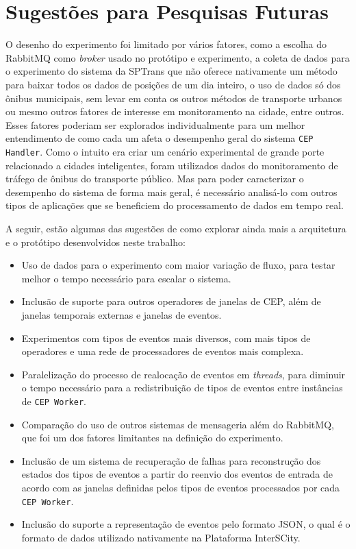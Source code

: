 \section{Sugestões para Pesquisas Futuras} 

O desenho do experimento foi limitado por vários fatores, como a escolha do RabbitMQ como \textit{broker} usado no protótipo e experimento, a coleta de dados para o experimento do sistema da SPTrans que não oferece nativamente um método para baixar todos os dados de posições de um dia inteiro, o uso de dados só dos ônibus municipais, sem levar em conta os outros métodos de transporte urbanos ou mesmo outros fatores de interesse em monitoramento na cidade, entre outros. Esses fatores poderiam ser explorados individualmente para um melhor entendimento de como cada um afeta o desempenho geral do sistema  \texttt{CEP Handler}. %
Como o intuito era criar um cenário experimental de grande porte relacionado a cidades inteligentes, foram utilizados dados do monitoramento de tráfego de ônibus do transporte público. Mas para poder caracterizar o desempenho do sistema de forma mais geral, é necessário analisá-lo com outros tipos de aplicações que se beneficiem do processamento de dados em tempo real. 

A seguir, estão algumas das sugestões de como explorar ainda mais a arquitetura e o protótipo desenvolvidos neste trabalho:

\begin{itemize}
    \item Uso de dados para o experimento com maior variação de fluxo, para testar melhor o tempo necessário para escalar o sistema.
    \item Inclusão de suporte para outros operadores de janelas de CEP, além de janelas temporais externas e janelas de eventos.
    \item Experimentos com tipos de eventos mais diversos, com mais tipos de operadores e uma rede de processadores de eventos mais complexa.
    \item Paralelização do processo de realocação de eventos em \textit{threads}, para diminuir o tempo necessário para a redistribuição de tipos de eventos entre instâncias de \texttt{CEP Worker}.
    \item Comparação do uso de outros sistemas de mensageria além do RabbitMQ, que foi um dos fatores limitantes na definição do experimento.
    \item Inclusão de um sistema de recuperação de falhas para reconstrução dos estados dos tipos de eventos a partir do reenvio dos eventos de entrada de acordo com as janelas definidas pelos tipos de eventos processados por cada \texttt{CEP Worker}.
    \item Inclusão do suporte a representação de eventos pelo formato JSON, o qual é o formato de dados utilizado nativamente na Plataforma InterSCity.
\end{itemize}

